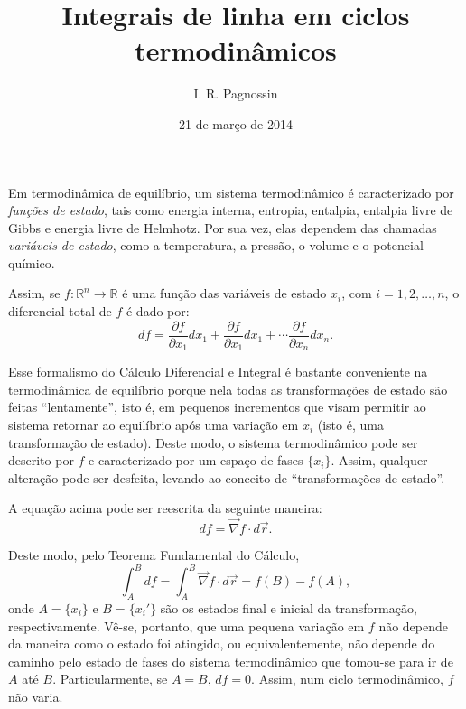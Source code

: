 \documentclass[a4paper,12pt]{article}
\title{Integrais de linha em ciclos termodinâmicos}
\author{I. R. Pagnossin}
\date{21 de março de 2014}
\begin{document}
  
  \maketitle
  
  Em termodinâmica de equilíbrio, um sistema termodinâmico é caracterizado por \emph{funções de estado}, tais como
  energia interna, entropia, entalpia, entalpia livre de Gibbs e energia livre de Helmhotz.
  Por sua vez, elas dependem das chamadas \emph{variáveis de estado}, como
  a temperatura, a pressão, o volume e o potencial químico.
  
  Assim, se $f: \mathbb{R}^n \to \mathbb{R}$ é uma função das variáveis de estado $x_i$, com $i = 1, 2, \ldots, n$,
  o diferencial total de $f$ é dado por:
  \begin{equation}\label{eq:df}
   df = \frac{\partial f}{\partial x_1} dx_1 + \frac{\partial f}{\partial x_1} dx_1 + \cdots \frac{\partial f}{\partial x_n} dx_n.
  \end{equation}
  
  Esse formalismo do Cálculo Diferencial e Integral é bastante conveniente na termodinâmica de equilíbrio
  porque nela todas as transformações de estado são feitas ``lentamente'', isto é, em pequenos incrementos
  que visam permitir ao sistema retornar ao equilíbrio após uma variação em $x_i$ (isto é, uma transformação de estado). Deste modo, o sistema
  termodinâmico pode ser descrito por $f$ e caracterizado por um espaço de fases $\{x_i\}$. Assim,
  qualquer alteração pode ser desfeita, levando ao conceito de ``transformações de estado''.

  A equação acima pode ser reescrita da seguinte maneira:
  \begin{equation}
    df = \vec\nabla f \cdot d\vec r.
  \end{equation}
  
  Deste modo, pelo Teorema Fundamental do Cálculo,
  \begin{equation}
    \int_A^B df = \int_A^B \vec\nabla f \cdot d\vec r = f(B) - f(A),
  \end{equation}
  onde $A = \{x_i\}$ e $B = \{x_i'\}$ são os estados final e inicial da transformação, respectivamente. Vê-se, portanto, que uma
pequena variação em $f$ não depende da maneira como o estado foi atingido, ou equivalentemente, não depende do caminho pelo estado
de fases do sistema termodinâmico que tomou-se para ir de $A$ até $B$. Particularmente, se $A = B$, $df = 0$. Assim, num ciclo
termodinâmico, $f$ não varia.
\end{document}
